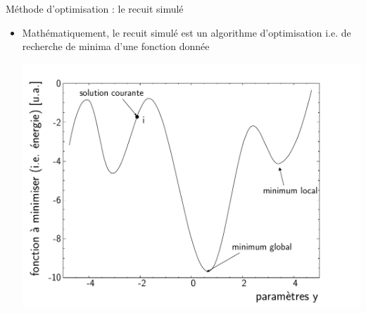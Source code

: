 \documentclass[t, compress]{beamer}
\begin{document}
\begin{frame}[c, fragile]{Méthode d'optimisation : le recuit simulé}

  \begin{itemize}

  \item Mathématiquement, le recuit simulé est un algorithme
    d'optimisation i.e. de recherche de minima d'une fonction donnée

    \begin{center}
      \includegraphics[scale=0.5]{figures/sam_1}
    \end{center}

  \end{itemize}

\end{frame}
\end{document}
